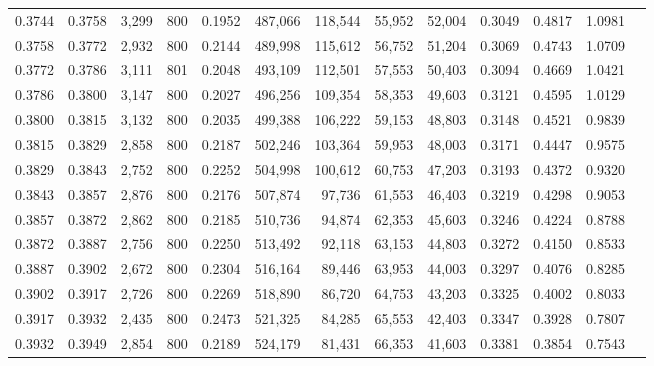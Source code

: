 \begin{tabular}{rrrrrrrrrrrrr}
0.3744 & 0.3758 &  3,299 &   800 &                                     0.1952 & 487,066 & 118,544 &  55,952 &  52,004 & 0.3049 & 0.4817 & 1.0981 \\
0.3758 & 0.3772 &  2,932 &   800 &                                     0.2144 & 489,998 & 115,612 &  56,752 &  51,204 & 0.3069 & 0.4743 & 1.0709 \\
0.3772 & 0.3786 &  3,111 &   801 &                                     0.2048 & 493,109 & 112,501 &  57,553 &  50,403 & 0.3094 & 0.4669 & 1.0421 \\
0.3786 & 0.3800 &  3,147 &   800 &                                     0.2027 & 496,256 & 109,354 &  58,353 &  49,603 & 0.3121 & 0.4595 & 1.0129 \\
0.3800 & 0.3815 &  3,132 &   800 &                                     0.2035 & 499,388 & 106,222 &  59,153 &  48,803 & 0.3148 & 0.4521 & 0.9839 \\
0.3815 & 0.3829 &  2,858 &   800 &                                     0.2187 & 502,246 & 103,364 &  59,953 &  48,003 & 0.3171 & 0.4447 & 0.9575 \\
0.3829 & 0.3843 &  2,752 &   800 &                                     0.2252 & 504,998 & 100,612 &  60,753 &  47,203 & 0.3193 & 0.4372 & 0.9320 \\
0.3843 & 0.3857 &  2,876 &   800 &                                     0.2176 & 507,874 &  97,736 &  61,553 &  46,403 & 0.3219 & 0.4298 & 0.9053 \\
0.3857 & 0.3872 &  2,862 &   800 &                                     0.2185 & 510,736 &  94,874 &  62,353 &  45,603 & 0.3246 & 0.4224 & 0.8788 \\
0.3872 & 0.3887 &  2,756 &   800 &                                     0.2250 & 513,492 &  92,118 &  63,153 &  44,803 & 0.3272 & 0.4150 & 0.8533 \\
0.3887 & 0.3902 &  2,672 &   800 &                                     0.2304 & 516,164 &  89,446 &  63,953 &  44,003 & 0.3297 & 0.4076 & 0.8285 \\
0.3902 & 0.3917 &  2,726 &   800 &                                     0.2269 & 518,890 &  86,720 &  64,753 &  43,203 & 0.3325 & 0.4002 & 0.8033 \\
0.3917 & 0.3932 &  2,435 &   800 &                                     0.2473 & 521,325 &  84,285 &  65,553 &  42,403 & 0.3347 & 0.3928 & 0.7807 \\
0.3932 & 0.3949 &  2,854 &   800 &                                     0.2189 & 524,179 &  81,431 &  66,353 &  41,603 & 0.3381 & 0.3854 & 0.7543 \\

\end{tabular}
